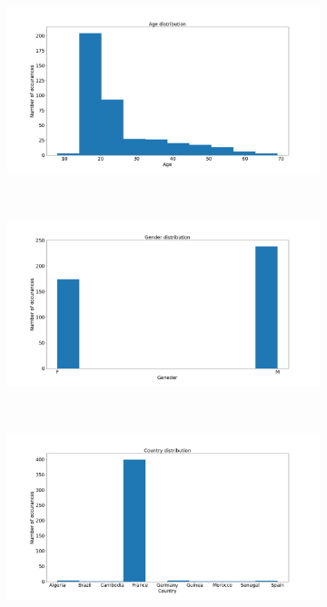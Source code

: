 \begin{figure}
    \centering
    \begin{subfigure}{0.45\textwidth}
        \includegraphics[scale=0.25]{images/dataset/age_dist.png}
    \end{subfigure}
    ~
    \begin{subfigure}{0.45\textwidth}
        \includegraphics[scale=0.25]{images/dataset/sex_dist.png}
    \end{subfigure}
    ~
    \begin{subfigure}{0.45\textwidth}
        \includegraphics[scale=0.25]{images/dataset/country.png}

\end{subfigure}
\end{figure}
